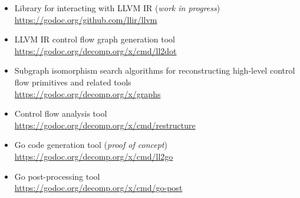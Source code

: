 \begin{itemize}
	\item Library for interacting with LLVM IR (\textit{work in progress}) \\ \url{https://godoc.org/github.com/llir/llvm}
	\item LLVM IR control flow graph generation tool \\ \url{https://godoc.org/decomp.org/x/cmd/ll2dot}
	\item Subgraph isomorphism search algorithms for reconstructing high-level control flow primitives and related tools \\ \url{https://godoc.org/decomp.org/x/graphs}
	\item Control flow analysis tool \\ \url{https://godoc.org/decomp.org/x/cmd/restructure}
	\item Go code generation tool (\textit{proof of concept}) \\ \url{https://godoc.org/decomp.org/x/cmd/ll2go}
	\item Go post-processing tool \\ \url{https://godoc.org/decomp.org/x/cmd/go-post}
\end{itemize}
